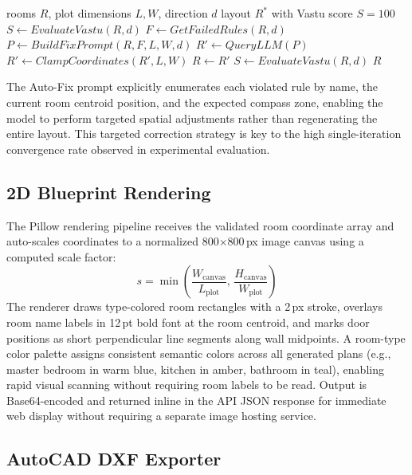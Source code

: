 \documentclass[10pt, twocolumn, letterpaper]{article}
\begin{document}
\begin{algorithm}[ht]
\caption{Vastu Auto-Fix Iterative Correction}
\label{alg:autofix}
\begin{algorithmic}[1]
\REQUIRE rooms $R$, plot dimensions $L, W$, direction $d$
\ENSURE layout $R^*$ with Vastu score $S = 100$
\STATE $S \leftarrow EvaluateVastu(R, d)$
  \STATE $F \leftarrow GetFailedRules(R, d)$
  \STATE $P \leftarrow BuildFixPrompt(R, F, L, W, d)$
  \STATE $R' \leftarrow QueryLLM(P)$
  \STATE $R' \leftarrow ClampCoordinates(R', L, W)$
  \STATE $R \leftarrow R'$
  \STATE $S \leftarrow EvaluateVastu(R, d)$
\ENDWHILE
\RETURN $R$
\end{algorithmic}
\end{algorithm}

The Auto-Fix prompt explicitly enumerates each violated rule by name, the
current room centroid position, and the expected compass zone, enabling the
model to perform targeted spatial adjustments rather than regenerating the
entire layout. This targeted correction strategy is key to the high
single-iteration convergence rate observed in experimental evaluation.

\subsection{2D Blueprint Rendering}

The Pillow rendering pipeline receives the validated room coordinate array and
auto-scales coordinates to a normalized 800$\times$800\,px image canvas using
a computed scale factor:
\begin{equation}
  s = \min\!\left(\frac{W_{\text{canvas}}}{L_{\text{plot}}},\,\frac{H_{\text{canvas}}}{W_{\text{plot}}}\right)
\end{equation}
The renderer draws type-colored room rectangles with a 2\,px stroke, overlays
room name labels in 12\,pt bold font at the room centroid, and marks door
positions as short perpendicular line segments along wall midpoints. A
room-type color palette assigns consistent semantic colors across all generated
plans (e.g., master bedroom in warm blue, kitchen in amber, bathroom in teal),
enabling rapid visual scanning without requiring room labels to be read.
Output is Base64-encoded and returned inline in the API JSON response for
immediate web display without requiring a separate image hosting service.

\subsection{AutoCAD DXF Exporter}
\end{document}
